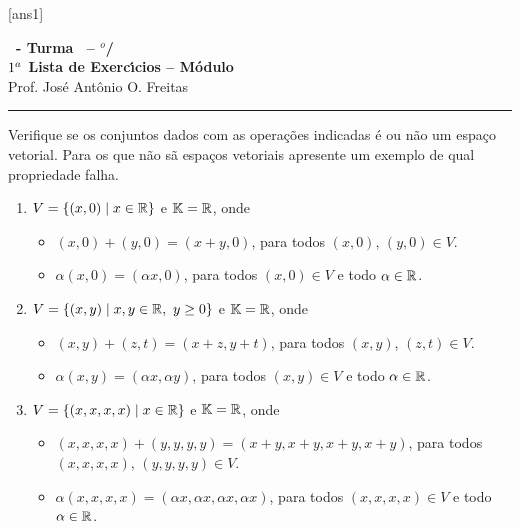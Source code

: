 \documentclass[12pt]{exam}
\begin{document}
  [ans1]
  \begin{center}
    {\Large\bf \disciplina\ - Turma \turma\ -- \semestre$^{o}$/\ano} \\ \vspace{9pt} {\large\bf
        $1^a$ Lista de Exerc{\'\i}cios -- Módulo \numeromodulo}\\ \vspace{9pt} Prof. Jos{\'e} Ant{\^o}nio O. Freitas
  \end{center}
  \hrule


\begin{exercicio}
  Verifique se os conjuntos dados com as operações indicadas é ou não um espaço vetorial. Para os que não sã espaços vetoriais apresente um exemplo de qual propriedade falha.
  \begin{enumerate}[label={\alph*)}]
    \item $V = \{(x, 0) \mid x \in \mathbb{R}\}$ e $\mathbb{K} = \mathbb{R}$, onde
      \begin{itemize}
        \item $(x, 0) + (y, 0) = (x + y, 0)$, para todos $(x, 0)$, $(y, 0) \in V$.
        \item $\alpha(x, 0) = (\alpha x, 0)$, para todos $(x, 0) \in V$ e todo $\alpha \in \mathbb{R}$.
      \end{itemize}

    \item $V = \{(x, y) \mid x, y \in \mathbb{R},\ y \ge 0\}$ e $\mathbb{K} = \mathbb{R}$, onde
      \begin{itemize}
        \item $(x, y) + (z, t) = (x + z, y + t)$, para todos $(x, y)$, $(z, t) \in V$.
        \item $\alpha(x, y) = (\alpha x, \alpha y)$, para todos $(x, y) \in V$ e todo $\alpha \in \mathbb{R}$.
      \end{itemize}
  
    \item $V = \{(x, x, x, x) \mid x \in \mathbb{R}\}$ e $\mathbb{K} = \mathbb{R}$, onde
      \begin{itemize}
        \item $(x, x, x, x) + (y, y, y, y) = (x + y, x + y, x + y, x + y)$, para todos $(x, x, x, x)$, $(y, y, y, y) \in V$.
        \item $\alpha(x, x, x, x) = (\alpha x, \alpha x, \alpha x, \alpha x)$, para todos $(x, x, x, x) \in V$ e todo $\alpha \in \mathbb{R}$.
      \end{itemize}
 

\end{enumerate}
\end{exercicio}
\end{document}

